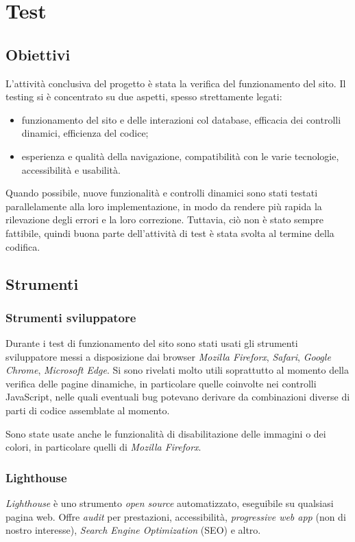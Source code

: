 \section{Test}
\label{test}

\subsection{Obiettivi}
\label{test-obiettivi}

L'attività conclusiva del progetto è stata la verifica del funzionamento del sito. Il testing si è concentrato su due aspetti, spesso strettamente legati: 
\begin{itemize}
	\item funzionamento del sito e delle interazioni col database, efficacia dei controlli dinamici, efficienza del codice;
	\item esperienza e qualità della navigazione, compatibilità con le varie tecnologie, accessibilità e usabilità.
\end{itemize}
Quando possibile, nuove funzionalità e controlli dinamici sono stati testati parallelamente alla loro implementazione, in modo da rendere più rapida la rilevazione degli errori e la loro correzione. Tuttavia, ciò non è stato sempre fattibile, quindi buona parte dell'attività di test è stata svolta al termine della codifica.

\subsection{Strumenti}
\label{test-strumenti}

\subsubsection{Strumenti sviluppatore}
\label{test-strumenti-sviluppatore}
Durante i test di funzionamento del sito sono stati usati gli strumenti sviluppatore messi a disposizione dai browser \textit{Mozilla Fireforx}, \textit{Safari}, \textit{Google Chrome}, \textit{Microsoft Edge}. Si sono rivelati molto utili soprattutto al momento della verifica delle pagine dinamiche, in particolare quelle coinvolte nei controlli JavaScript, nelle quali eventuali bug potevano derivare da combinazioni diverse di parti di codice assemblate al momento.

Sono state usate anche le funzionalità di disabilitazione delle immagini o dei colori, in particolare quelli di \textit{Mozilla Fireforx}.


\subsubsection{Lighthouse}
\label{test-strumenti-lighthouse}
\textit{Lighthouse} è uno strumento \textit{open source} automatizzato, eseguibile su qualsiasi pagina web. Offre \textit{audit} per prestazioni, accessibilità, \textit{progressive web app} (non di nostro interesse), \textit{Search Engine Optimization} (SEO) e altro.

